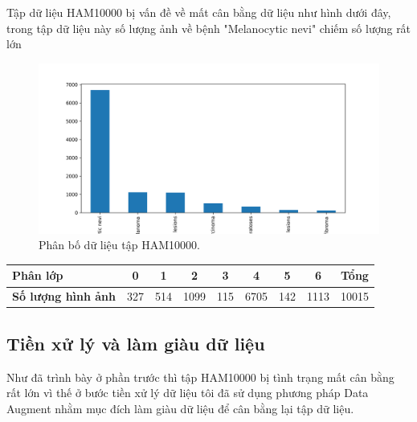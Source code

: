 \documentclass[12pt,a4paper]{article}
\begin{document}
	\noindent
	Tập dữ liệu HAM10000 bị vấn đề về mất cân bằng dữ liệu như hình dưới đây, trong tập dữ liệu này số lượng ảnh về bệnh "Melanocytic nevi" chiếm số lượng rất lớn\\	
	
	
	\begin{figure}[h!]
		\centering
		\includegraphics[width=0.5\linewidth]{./images/imbalance.png}
		\caption{Phân bố dữ liệu tập HAM10000.}
		\label{fig:ham10000}
	\end{figure}

	\begin{center}
		\begin{tabular}{|l|c|c|c|c|c|c|c|l|}
			\hline
			\rowcolor[HTML]{000000} 
			{\color[HTML]{FFFFFF} \textbf{Phân lớp}} & {\color[HTML]{FFFFFF} \textbf{0}} & {\color[HTML]{FFFFFF} \textbf{1}} & {\color[HTML]{FFFFFF} \textbf{2}} & {\color[HTML]{FFFFFF} \textbf{3}} & {\color[HTML]{FFFFFF} \textbf{4}} & {\color[HTML]{FFFFFF} \textbf{5}} & {\color[HTML]{FFFFFF} \textbf{6}} & {\color[HTML]{FFFFFF} \textbf{Tổng}} \\ \hline
			\textbf{Số lượng hình ảnh}               & 327                               & 514                               & 1099                              & 115                               & 6705                              & 142                               & 1113                              & 10015                                \\ \hline
		\end{tabular}
	\end{center}
	
	\subsection{Tiền xử lý và làm giàu dữ liệu}
	
	Như đã trình bày ở phần trước thì tập HAM10000 bị tình trạng mất cân bằng rất lớn vì thế ở bước tiền xử lý dữ liệu tôi đã sử dụng phương pháp Data Augment nhằm mục đích làm giàu dữ liệu để cân bằng lại tập dữ liệu.\\
	
\end{document}
